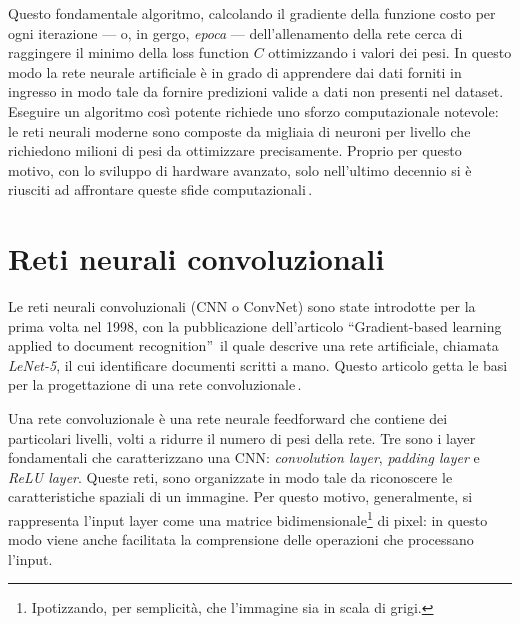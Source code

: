 \noindent Questo fondamentale algoritmo, calcolando il gradiente della funzione costo per ogni iterazione — o, in gergo, \textsl{epoca} — dell'allenamento della rete cerca di raggingere il minimo della loss function $C$ ottimizzando i valori dei pesi. In questo modo la rete neurale artificiale è in grado di apprendere dai dati forniti in ingresso in modo tale da fornire predizioni valide a dati non presenti nel dataset. Eseguire un algoritmo così potente richiede uno sforzo computazionale notevole: le reti neurali moderne sono composte da migliaia di neuroni per livello che richiedono milioni di pesi da ottimizzare precisamente. Proprio per questo motivo, con lo sviluppo di hardware avanzato, solo nell'ultimo decennio si è riusciti ad affrontare queste sfide computazionali\,\cite{flasinski2016introduction, rojas1996backpropagation, nielsen2015neural}.


\section{Reti neurali convoluzionali}
% 
Le reti neurali convoluzionali (\acs{CNN} o \acs{ConvNet}) sono state introdotte per la prima volta nel 1998, con la pubblicazione dell'articolo ``Gradient-based learning applied to document recognition''\,\cite{lecun1998gradient} il quale descrive una rete artificiale, chiamata \textit{LeNet-5}, il cui identificare documenti scritti a mano. Questo articolo getta le basi per la progettazione di una rete convoluzionale\,\cite{aggarwal2018neural}.

Una rete convoluzionale è una rete neurale feedforward che contiene dei particolari livelli, volti a ridurre il numero di pesi della rete. Tre sono i layer fondamentali che caratterizzano una \acs{CNN}: \textit{convolution layer}, \textit{padding layer} e \textit{\acs{ReLU} layer}. Queste reti, sono organizzate in modo tale da riconoscere le caratteristiche spaziali di un immagine. Per questo motivo, generalmente, si rappresenta l'input layer come una matrice bidimensionale\footnote{Ipotizzando, per semplicità, che l'immagine sia in scala di grigi.} di pixel: in questo modo viene anche facilitata la comprensione delle operazioni che processano l'input.

